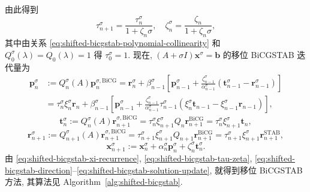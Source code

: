 {由此得到}
\begin{equation}\label{eq:shifted-bicgstab-tau-zeta}\tau_{n+1}^{\sigma}=\frac{\tau_n^{\sigma}}{1+\zeta_n\sigma},\quad\zeta_n^{\sigma}=\frac{\zeta_n}{1+\zeta_n\sigma},\end{equation}
{其中由关系 \eqref{eq:shifted-bicgstab-polynomial-collinearity} 和 $Q_0^{\sigma}(\lambda)=Q_0(\lambda)=1$ 得 $\tau_0^{\sigma}=1$. 现在, $(A+\sigma I)\bm x^{\sigma}=\bm b$ 的移位 BiCGSTAB 迭代量为}
\begin{equation}\label{eq:shifted-bicgstab-direction}\begin{aligned}\bm p_n^{\sigma}&:=Q_n^{\sigma}(A)\bm p_n^{\sigma,\mathrm{BiCG}}=\bm r_n^{\sigma}+\beta_{n-1}^{\sigma}\left[\bm p_{n-1}^{\sigma}+\frac{\zeta_{n-1}^{\sigma}}{\alpha_{n-1}^{\sigma}}(\bm t_{n-1}^{\sigma}-\bm r_{n-1}^{\sigma})\right]\\&=\tau_n^{\sigma}\xi_n^{\sigma}\bm r_n+\beta_{n-1}^{\sigma}\left[\bm p_{n-1}^{\sigma}+\frac{\zeta_{n-1}^{\sigma}}{\alpha_{n-1}^{\sigma}}\tau_{n-1}^{\sigma}(\xi_n^{\sigma}\bm t_{n-1}-\xi_{n-1}^{\sigma}\bm r_{n-1})\right],\end{aligned}\end{equation}
\begin{equation}\label{eq:shifted-bicgstab-intermediate}\bm t_n^{\sigma}:=Q_n^{\sigma}(A)\bm r_{n+1}^{\sigma,\mathrm{BiCG}}=\tau_n^{\sigma}\xi_{n+1}^{\sigma}Q_n\bm r_{n+1}^{\mathrm{BiCG}}=\tau_n^{\sigma}\xi_{n+1}^{\sigma}\bm t_n,\end{equation}
\begin{equation}\label{eq:shifted-bicgstab-residual-update}\bm r_{n+1}^{\sigma}:=Q_{n+1}^{\sigma}(A)\bm r_{n+1}^{\sigma,\mathrm{BiCG}}=\tau_{n+1}^{\sigma}\xi_{n+1}^{\sigma}Q_{n+1}\bm r_{n+1}^{\mathrm{BiCG}}=\tau_{n+1}^{\sigma}\xi_{n+1}^{\sigma}\bm r_{n+1}^{\mathrm{STAB}},\end{equation}
\begin{equation}\label{eq:shifted-bicgstab-solution-update}\bm x_{n+1}^{\sigma}:=\bm x_n^{\sigma}+\alpha_n^{\sigma}\bm p_n^{\sigma}+\zeta_n^{\sigma}\bm t_n^{\sigma}.\end{equation}
{由 \eqref{eq:shifted-bicgstab-xi-recurrence}, \eqref{eq:shifted-bicgstab-tau-zeta}, \eqref{eq:shifted-bicgstab-direction}--\eqref{eq:shifted-bicgstab-solution-update}, 就得到移位 BiCGSTAB 方法, 其算法见 Algorithm\ \ref{alg:shifted-bicgstab}.}
